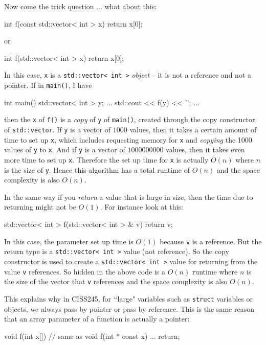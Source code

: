 Now come the trick question ... what about this:
\begin{console}
int f(const std::vector< int > x)
{
    return x[0];
}
\end{console}
or
\begin{console}
int f(std::vector< int > x)
{
    return x[0];
}
\end{console}
In this case, \verb!x! is a \verb!std::vector< int >! \textit{object} -- it is
not a reference and not a pointer.
If in \verb!main()!, I have
\begin{console}
int main()
{
    std::vector< int > y;
    ...
    std::cout << f(y) << '\n';
    ...
}
\end{console}
then the \verb!x! of \verb!f()! is a \textit{copy} of \verb!y! of \verb!main()!,
created through the
copy constructor of \verb!std::vector!.
If \verb!y! is a vector of $1000$ values, then it takes
a certain amount of time to set up \verb!x!,
which includes requesting memory for \verb!x! and
\textit{copying} the 1000 values of \verb!y! to \verb!x!.
And if \verb!y! is a vector of $1000000000$ values, then it
takes even more time to set up \verb!x!. 
Therefore the set up time for \verb!x! is actually $O(n)$
where $n$ is the size of \verb!y!.
Hence this algorithm has a total runtime of $O(n)$ and the space complexity is also
$O(n)$.

In the same way if you \textit{return} a value that is large in size, then the time
due to returning might not be $O(1)$.
For instance look at this:
\begin{console}
std::vector< int > f(std::vector< int > & v)
{
    return v;
}
\end{console}
In this case, the parameter set up time is $O(1)$ because \verb!v! is a reference.
But the return type is a \verb!std::vector< int >! value (not reference).
So the copy constructor is used to create a \verb!std::vector< int >! value
for returning
from the value \verb!v! references.
So hidden in the above code is a $O(n)$ runtime where $n$ is the
size of the vector that \verb!v! references
and the space complexity is also $O(n)$.

This explains why in CISS245,
for \lq\lq large" variables such as \verb!struct! variables or objects,
we always pass by pointer or pass by reference.
This is the same reason that an array parameter of a function
is actually a pointer:
\begin{console}
void f(int x[]) // same as void f(int * const x)
{
     ...
     return; 
}
\end{console}


